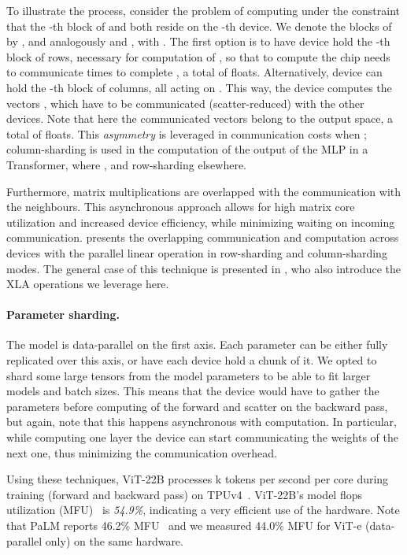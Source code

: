 \documentclass{article}
\newcommand{\chonk}{\mbox{ViT-22B}\xspace}
\begin{document}
To illustrate the process, consider the problem of computing  under the constraint that the -th block of  and  both reside  on the -th device. We denote the blocks of  by , and analogously  and  , with .
The first option is to have device  hold the -th block of rows, necessary for computation of , so that to compute  the chip needs to communicate  times to complete , a total of  floats.
Alternatively, device  can hold the -th block of columns, all acting on .
This way, the device computes the vectors , which have to be communicated (scatter-reduced) with the other devices.
Note that here the communicated vectors belong to the output space, a total of  floats.
This \emph{asymmetry} is leveraged in communication costs when ; column-sharding is used in the computation of the output of the MLP in a Transformer, where , and row-sharding elsewhere.

Furthermore, matrix multiplications are overlapped with the communication with the neighbours.
This asynchronous approach allows for high matrix core utilization and increased device efficiency, while minimizing waiting on incoming communication.
 presents the overlapping communication and computation across  devices with the parallel linear operation in row-sharding and column-sharding modes.
The general case of this technique is presented in \citet{wang2022overlap}, who
also introduce the XLA operations we leverage here.

\paragraph{Parameter sharding.}
The model is data-parallel on the first axis.
Each parameter can be either fully replicated over this axis, or have each device hold a chunk of it.
We opted to shard some large tensors from the model parameters to be able to fit larger models and batch sizes.
This means that the device would have to gather the parameters before computing of the forward and scatter on the backward pass, but again, note that this happens asynchronous with computation.
In particular, while computing one layer the device can start communicating the weights of the next one, thus minimizing the communication overhead.


Using these techniques, \chonk processes k tokens per second per core during training (forward and backward pass) on TPUv4~\citep{jouppi2020domain}. 
\chonk's model flops utilization (MFU)~\citep{chowdhery2022palm,dehghani2021efficiency} is \emph{54.9\%}, indicating a very efficient use of the hardware. Note that PaLM reports 46.2\% MFU~\citep{chowdhery2022palm, pope2022efficiently} and we measured 44.0\% MFU for ViT-e (data-parallel only) on the same hardware.
%
\end{document}
